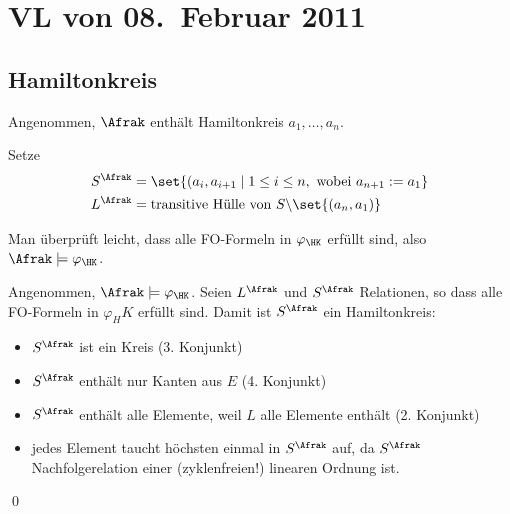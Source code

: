 \section{VL von 08.~Februar 2011}

\subsection{Hamiltonkreis}

Angenommen, $\Afrak$ enthält Hamiltonkreis $a_1,\dots,a_n$.

Setze 
\begin{align*}
  S^\Afrak &= \set{(a_i,a_{i+1} \mid 1\leq i\leq n,\ \text{wobei}\ a_{n+1} := a_1} \\
  L^\Afrak &= \text{transitive Hülle von}\ S\backslash\set{(a_n,a_1)}
\end{align*}

Man überprüft leicht, dass alle FO-Formeln in $\varphi_\HK$ erfüllt sind,
also $\Afrak\models\varphi_\HK$.

Angenommen, $\Afrak\models\varphi_\HK$. Seien $L^\Afrak$ und $S^\Afrak$
Relationen, so dass alle FO-Formeln in $\varphi_HK$ erfüllt sind.
Damit ist $S^\Afrak$ ein Hamiltonkreis:

\begin{itemize}
  \item $S^\Afrak$ ist ein Kreis (3. Konjunkt)
  \item $S^\Afrak$ enthält nur Kanten aus $E$ (4. Konjunkt)
  \item $S^\Afrak$ enthält alle Elemente, weil $L$ alle Elemente enthält (2. Konjunkt)
  \item jedes Element taucht höchsten einmal in $S^\Afrak$ auf, da $S^\Afrak$
  Nachfolgerelation einer (zyklenfreien!) linearen Ordnung ist.
\end{itemize}
\qed
